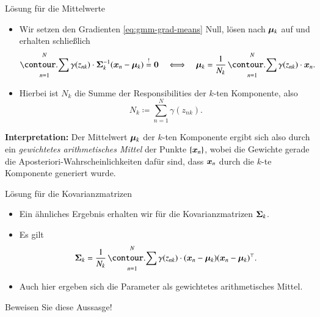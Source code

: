 \begin{frame}{Lösung für die Mittelwerte}{}
	\begin{itemize}
		\item Wir setzen den Gradienten \eqref{eq:gmm-grad-means} Null, lösen nach $\bm{\mu}_k$ auf und erhalten schließlich
		\begin{equation} \label{eq:gmm-update-means}
			\sum_{n=1}^N \gamma(z_{nk}) \cdot \bSigma_k^{-1} (\bx_n - \bmu_k) \overset{!}{=} \0
		\quad\Longleftrightarrow\quad
			\bmu_k = \frac{1}{N_k} \sum_{n=1}^N \gamma(z_{nk}) \cdot \bx_n.
		\end{equation}
		\item Hierbei ist $N_k$ die Summe der Responsibilities der $k$-ten Komponente, also
		\begin{equation*}
			N_k \coloneqq \sum_{n=1}^N \gamma(z_{nk}).
		\end{equation*}
	\end{itemize}
	
	\begin{boxGray}
		\textbf{Interpretation:} Der Mittelwert $\bm{\mu}_k$ der $k$-ten Komponente ergibt sich also durch ein
		\textit{gewichtetes arithmetisches Mittel} der Punkte $\{ \bm{x}_n \}$, wobei die Gewichte gerade die
		Aposteriori-Wahrscheinlichkeiten dafür sind, dass $\bm{x}_n$ durch die $k$-te Komponente generiert wurde.
	\end{boxGray}
\end{frame}


\begin{frame}{Lösung für die Kovarianzmatrizen}{}
	\begin{itemize}
		\item Ein ähnliches Ergebnis erhalten wir für die Kovarianzmatrizen $\bm{\Sigma}_k$.
		\item Es gilt
		\begin{equation} \label{eq:gmm-update-cov}
			\bSigma_k = \frac{1}{N_k} \sum_{n=1}^N \gamma(z_{nk}) \cdot (\bx_n - \bmu_k) (\bx_n - \bmu_k)^\top.
		\end{equation}
		\item Auch hier ergeben sich die Parameter als gewichtetes arithmetisches Mittel.
	\end{itemize}
	
	\begin{mytask}
		Beweisen Sie diese Aussasge!
	\end{mytask}
\end{frame}



